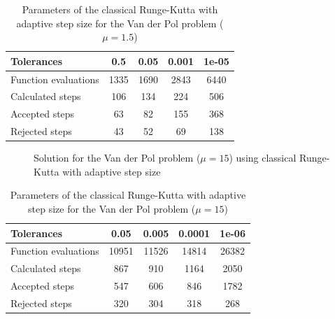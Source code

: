 \begin{table}[H]
    \centering
    \begin{tabular}{@{}l|cccc@{}}
    \toprule
    Tolerances           & 0.5  & 0.05 & 0.001 & 1e-05 \\ \midrule
    Function evaluations & 1335 & 1690 & 2843  & 6440  \\
    Calculated steps     & 106  & 134  & 224   & 506   \\
    Accepted steps       & 63   & 82   & 155   & 368   \\
    Rejected steps       & 43   & 52   & 69    & 138   \\ \bottomrule
    \end{tabular}
    \caption{Parameters of the classical Runge-Kutta with adaptive step size for the Van der Pol problem ($\mathit{\mu = 1.5}$)}
    \label{6_4_adaptive_mu_1_5_table}
\end{table}

\begin{figure}[H]
    \centering
    \caption{Solution for the Van der Pol problem ($\mathit{\mu = 15}$) using classical Runge-Kutta with adaptive step size}
    \label{6_4_RK4_mu_15}
\end{figure}

\begin{table}[H]
    \centering
    \begin{tabular}{@{}l|cccc@{}}
    \toprule
    Tolerances           & 0.05  & 0.005 & 0.0001 & 1e-06 \\ \midrule
    Function evaluations & 10951 & 11526 & 14814  & 26382 \\
    Calculated steps     & 867   & 910   & 1164   & 2050  \\
    Accepted steps       & 547   & 606   & 846    & 1782  \\
    Rejected steps       & 320   & 304   & 318    & 268   \\ \bottomrule
    \end{tabular}
    \caption{Parameters of the classical Runge-Kutta with adaptive step size for the Van der Pol problem ($\mathit{\mu = 15}$)}
    \label{6_4_adaptive_mu_15_table}
\end{table}

